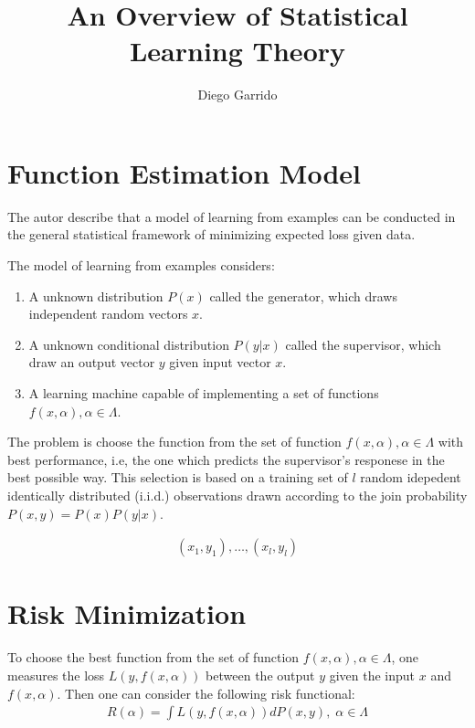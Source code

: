 \documentclass{article}
\title{An Overview of Statistical Learning Theory}
\author{Diego Garrido}
\begin{document}
\maketitle


\section{Function Estimation Model}


The autor describe that a model of learning from examples can be conducted in the general statistical framework of minimizing expected loss given data.

The model of learning from examples considers:
\begin{enumerate}
    \item A unknown distribution $P(x)$ called the generator, which draws independent random vectors $x$. 
    \item A unknown conditional distribution $P(y|x)$ called the supervisor, which draw an output vector $y$ given input vector $x$.
    \item A learning machine capable of implementing a set of functions $f(x,\alpha), \alpha \in \Lambda$.
\end{enumerate}

The problem is choose the function from the set of function $f(x,\alpha), \alpha \in \Lambda$ with best performance, i.e, the one which predicts the supervisor's responese in the best possible way. This selection is based on a training set of $l$ random idepedent identically distributed (i.i.d.) observations drawn according to the join probability $P(x,y) = P(x)P(y|x)$.

\begin{align}
    (x_{1}, y_{1}), \ldots, (x_{l}, y_{l})
\end{align}

\section{Risk Minimization}

To choose the best function from the set of function $f(x,\alpha), \alpha \in \Lambda$, one measures the loss $L(y,f(x, \alpha))$ between the output $y$ given the input $x$ and $f(x,\alpha)$. Then one can consider the following risk functional:
\begin{align}
    R(\alpha) = \int L(y, f(x,\alpha))dP(x,y), \; \alpha \in \Lambda
\end{align}
\end{document}
